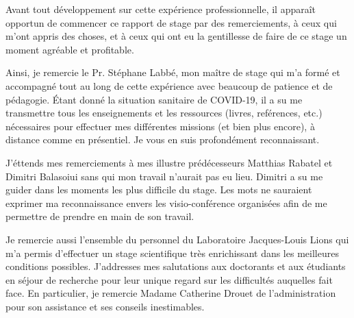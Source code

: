 \documentclass[ 
11pt, %
french, %
singlespacing, %
parskip, %
headsepline, %
openany, %
]{MastersDoctoralThesis} %
\theoremstyle{plain}
\numberwithin{theorem}{section}  %
\begin{document}
%


\begin{acknowledgements}
\addchaptertocentry{\acknowledgementname} %



\vspace*{1cm}

\hspace{12pt} Avant tout développement sur cette expérience professionnelle, il apparaît opportun de commencer ce rapport de stage par des remerciements, à ceux qui m’ont appris des choses, et à ceux qui ont eu la gentillesse de faire de ce stage un moment agréable et profitable.

\hspace{12pt} Ainsi, je remercie le Pr. Stéphane Labbé, mon maître de stage qui m’a formé et accompagné tout au long de cette expérience avec beaucoup de patience et de pédagogie. Étant donné la situation sanitaire de COVID-19, il a su me transmettre tous les enseignements et les ressources (livres, reférences, etc.) nécessaires pour effectuer mes différentes missions (et bien plus encore), à distance comme en présentiel. Je vous en suis profondément reconnaissant.

\hspace{12pt} J'éttends mes remerciements à mes illustre prédécesseurs Matthias Rabatel et Dimitri Balasoiui sans qui mon travail n'aurait pas eu lieu. Dimitri a su me guider dans les moments les plus difficile du stage. Les mots ne sauraient exprimer ma reconnaissance envers les visio-conférence organisées afin de me permettre de prendre en main de son travail.

\hspace{12pt} Je remercie aussi l'ensemble du personnel du Laboratoire Jacques-Louis Lions qui m’a permis d’effectuer un stage scientifique très enrichissant dans les meilleures conditions possibles. J'addresses mes salutations aux doctorants et aux étudiants en séjour de recherche pour leur unique regard sur les difficultés auquelles fait face. En particulier, je remercie Madame Catherine Drouet de l'administration pour son assistance et ses conseils inestimables.


\end{acknowledgements}
\end{document}
